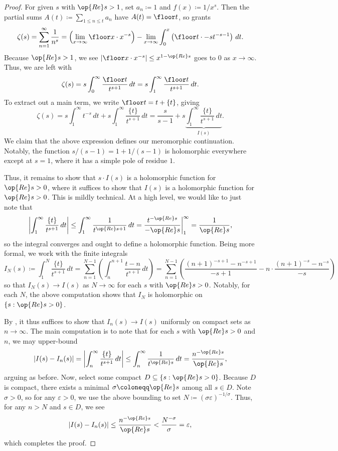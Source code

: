 \documentclass[../notes.tex]{subfiles}
\begin{document}
\begin{proof}
	For given $s$ with $\op{Re}s>1$, set $a_n\coloneqq1$ and $f(x)\coloneqq1/x^s$. Then the partial sums $A(t)\coloneqq\sum_{1\le n\le t}a_n$ have $A(t)=\floor t$, so  grants
	\[\zeta(s)=\sum_{n=1}^\infty\frac1{n^s}=\left(\lim_{x\to\infty}\floor x\cdot x^{-s}\right)-\lim_{x\to\infty}\int_0^x\left(\floor t\cdot -st^{-s-1}\right)\,dt.\]
	Because $\op{Re}s>1$, we see $\left|\floor x\cdot x^{-s}\right|\le x^{1-\op{Re}s}$ goes to $0$ as $x\to\infty$. Thus, we are left with
	\[\zeta(s)=s\int_0^\infty\frac{\floor t}{t^{s+1}}\,dt=s\int_1^\infty\frac{\floor t}{t^{s+1}}\,dt.\]
	To extract out a main term, we write $\floor t=t+\{t\}$, giving
	\[\zeta(s)=s\int_1^\infty t^{-s}\,dt+s\int_1^\infty\frac{\{t\}}{t^{s+1}}\,dt=\frac s{s-1}+s\underbrace{\int_1^\infty\frac{\{t\}}{t^{s+1}}\,dt}_{I(s)}.\]
	We claim that the above expression defines our meromorphic continuation. Notably, the function $s/(s-1)=1+1/(s-1)$ is holomorphic everywhere except at $s=1$, where it has a simple pole of residue $1$.

	Thus, it remains to show that $s\cdot I(s)$ is a holomorphic function for $\op{Re}s>0$, where it suffices to show that $I(s)$ is a holomorphic function for $\op{Re}s>0$. This is mildly technical. At a high level, we would like to just note that
	\[\left|\int_1^\infty\frac{\{t\}}{t^{s+1}}\,dt\right|\le\int_1^\infty\frac{1}{t^{\op{Re}s+1}}\,dt=\frac{t^{-\op{Re}s}}{-\op{Re}s}\bigg|_1^\infty=\frac1{\op{Re}s},\]
	so the integral converges and ought to define a holomorphic function. Being more formal, we work with the finite integrals
	\[I_N(s)\coloneqq\int_1^N\frac{\{t\}}{t^{s+1}}\,dt=\sum_{n=1}^{N-1}\left(\int_n^{n+1}\frac{t-n}{t^{s+1}}\,dt\right)=\sum_{n=1}^{N-1}\left(\frac{\left(n+1\right)^{-s+1}-n^{-s+1}}{-s+1}-n\cdot\frac{\left(n+1\right)^{-s}-n^{-s}}{-s}\right)\]
	so that $I_N(s)\to I(s)$ as $N\to\infty$ for each $s$ with $\op{Re}s>0$. Notably, for each $N$, the above computation shows that $I_N$ is holomorphic on $\{s:\op{Re}s>0\}$.

	By , it thus suffices to show that $I_n(s)\to I(s)$ uniformly on compact sets as $n\to\infty$. The main computation is to note that for each $s$ with $\op{Re}s>0$ and $n$, we may upper-bound
	\[|I(s)-I_n(s)|=\left|\int_n^\infty\frac{\{t\}}{t^{s+1}}\,dt\right|\le\int_n^\infty\frac1{t^{\op{Re}s}}\,dt=\frac{n^{-\op{Re}s}}{\op{Re}s},\]
	arguing as before. Now, select some compact $D\subseteq\{s:\op{Re}s>0\}$. Because $D$ is compact, there exists a minimal $\sigma\coloneqq\op{Re}s$ among all $s\in D$. Note $\sigma>0$, so for any $\varepsilon>0$, we use the above bounding to set $N\coloneqq(\sigma\varepsilon)^{-1/\sigma}$. Thus, for any $n>N$ and $s\in D$, we see
	\[\left|I(s)-I_n(s)\right|\le\frac{n^{-\op{Re}s}}{\op{Re}s}<\frac{N^{-\sigma}}\sigma=\varepsilon,\]
	which completes the proof.
\end{proof}
\end{document}
